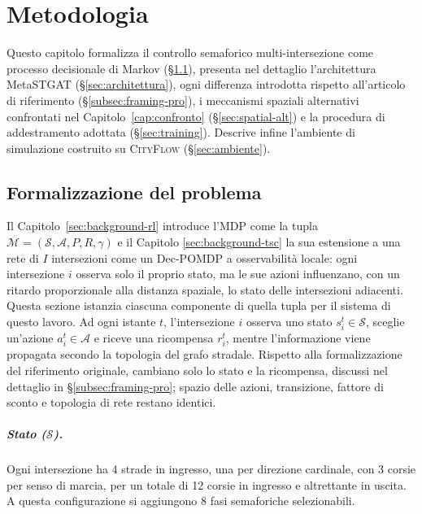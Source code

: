 \chapter{Metodologia}
\label{cap:tsc-modelli}

Questo capitolo formalizza il controllo semaforico multi-intersezione
come processo decisionale di Markov (§\ref{sec:formalizzazione}),
presenta nel dettaglio l'architettura MetaSTGAT (§\ref{sec:architettura}),
ogni differenza introdotta rispetto all'articolo di riferimento
(§\ref{subsec:framing-pro}), i meccanismi spaziali alternativi
confrontati nel Capitolo~\ref{cap:confronto} (§\ref{sec:spatial-alt}) e la
procedura di addestramento adottata (§\ref{sec:training}). Descrive
infine l'ambiente di simulazione costruito su \textsc{CityFlow}
(§\ref{sec:ambiente}).

\section{Formalizzazione del problema}
\label{sec:formalizzazione}

Il Capitolo~\ref{sec:background-rl} introduce l'MDP
come la tupla $\mathcal{M} = (\mathcal{S}, \mathcal{A}, P, R, \gamma)$ e
il Capitolo \ref{sec:background-tsc} la sua estensione a una rete di $I$ intersezioni
come un Dec-POMDP a osservabilità locale: ogni intersezione $i$ osserva solo
il proprio stato, ma le sue azioni influenzano, con un ritardo proporzionale
alla distanza spaziale, lo stato delle intersezioni adiacenti. Questa sezione
istanzia ciascuna componente di quella tupla per il sistema di questo lavoro.
Ad ogni istante $t$, l'intersezione $i$ osserva uno stato $s_i^t \in \mathcal{S}$, sceglie
un'azione $a_i^t \in \mathcal{A}$ e riceve una ricompensa $r_i^t$,
mentre l'informazione viene propagata secondo la topologia del grafo stradale.
Rispetto alla formalizzazione del riferimento originale, cambiano solo lo
stato e la ricompensa, discussi nel dettaglio in §\ref{subsec:framing-pro};
spazio delle azioni, transizione, fattore di sconto e topologia di rete
restano identici.

\paragraph{Stato ($\mathcal{S}$).} Ogni intersezione ha 4 strade in ingresso,
una per direzione cardinale, con 3 corsie per senso di marcia, per un totale
di 12 corsie in ingresso e altrettante in uscita. A
questa configurazione si aggiungono 8 fasi semaforiche selezionabili.

